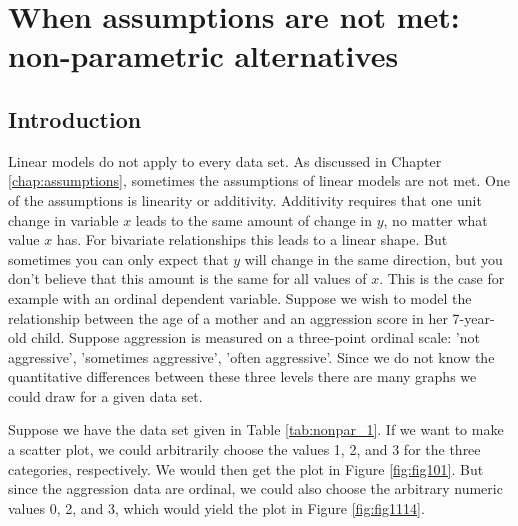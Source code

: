 \chapter{When assumptions are not met: non-parametric alternatives}\label{chap:nonpar1}


\section{Introduction}

Linear models do not apply to every data set. As discussed in Chapter \ref{chap:assumptions}, sometimes the assumptions of linear models are not met. One of the assumptions is linearity or additivity. Additivity requires that one unit change in variable $x$ leads to the same amount of change in $y$, no matter what value $x$ has. For bivariate relationships this leads to a linear shape. But sometimes you can only expect that $y$ will change in the same direction, but you don't believe that this amount is the same for all values of $x$. This is the case for example with an ordinal dependent variable. Suppose we wish to model the relationship between the age of a mother and an aggression score in her 7-year-old child. Suppose aggression is measured on a three-point ordinal scale: 'not aggressive', 'sometimes aggressive', 'often aggressive'. Since we do not know the quantitative differences between these three levels there are many graphs we could draw for a given data set.


Suppose we have the data set given in Table \ref{tab:nonpar_1}. If we want to make a scatter plot, we could arbitrarily choose the values 1, 2, and 3 for the three categories, respectively. We would then get the plot in Figure \ref{fig:fig101}. But since the aggression data are ordinal, we could also choose the arbitrary numeric values 0, 2, and 3, which would yield the plot in Figure \ref{fig:fig1114}. 


\begin{kframe}


{\ttfamily\noindent\bfseries{}}\end{kframe}



\begin{knitrout}
\color{fgcolor}\begin{kframe}


{\ttfamily\noindent\bfseries{}}\end{kframe}
\end{knitrout}


